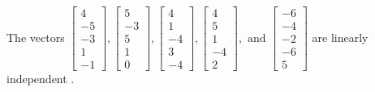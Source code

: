 \begin{exercise}
\begin{exerciseStatement}
  \end{exerciseStatement}
  \begin{exerciseAnswer}
   The vectors \(\left[\begin{array}{r}
4 \\
-5 \\
-3 \\
1 \\
-1
\end{array}\right] , \left[\begin{array}{r}
5 \\
-3 \\
5 \\
1 \\
0
\end{array}\right] , \left[\begin{array}{r}
4 \\
1 \\
-4 \\
3 \\
-4
\end{array}\right] , \left[\begin{array}{r}
4 \\
5 \\
1 \\
-4 \\
2
\end{array}\right] , \text{ and } \left[\begin{array}{r}
-6 \\
-4 \\
-2 \\
-6 \\
5
\end{array}\right]\) are 
  	 linearly independent  .
  


  \end{exerciseAnswer}
\end{exercise}